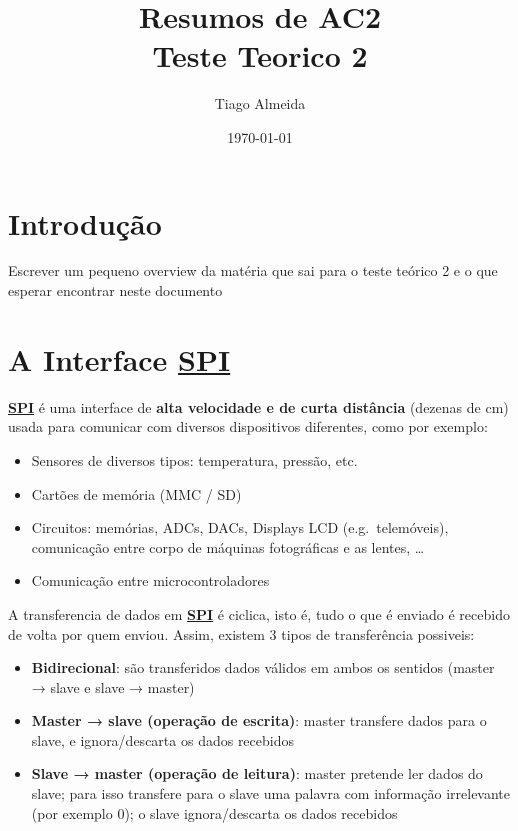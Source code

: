 \documentclass[a4paper, 12pt, onecolumn, oneside]{scrartcl}
\title{%
  Resumos de AC2 \\
  \large Teste Teorico 2}
\author{Tiago Almeida}
\date{\today}
\begin{document}
\maketitle

\tableofcontents

\section{Introdução}
Escrever um pequeno overview da matéria que sai para o teste teórico 2
e o que esperar encontrar neste documento

\clearpage

\section{A Interface \hyperref[spi]{\textbf{\large{SPI}}}}
\hyperref[spi]{\textbf{SPI}} é uma interface de \textbf{alta velocidade e de curta distância} (dezenas de cm) usada para comunicar com
diversos dispositivos diferentes, como por exemplo:
\begin{itemize}
    \item Sensores de diversos tipos: temperatura, pressão, etc.
    \item Cartões de memória (MMC / SD)
    \item Circuitos: memórias, ADCs, DACs, Displays LCD (e.g.\ telemóveis),
    comunicação entre corpo de máquinas fotográficas e as lentes, \ldots
    \item Comunicação entre microcontroladores
\end{itemize}

A transferencia de dados em \hyperref[spi]{\textbf{SPI}} é ciclica, isto é, tudo o que é enviado é recebido de volta por quem enviou.
Assim, existem 3 tipos de transferência possiveis:
\begin{itemize}
    \item \textbf{Bidirecional}: são transferidos dados válidos em ambos os sentidos
    (master → slave e slave → master)
    \item \textbf{Master → slave (operação de escrita)}: master transfere dados
    para o slave, e ignora/descarta os dados recebidos
    \item \textbf{Slave → master (operação de leitura)}: master pretende ler dados do slave; 
    para isso transfere para o slave uma palavra com informação irrelevante (por exemplo 0); 
    o slave ignora/descarta os dados recebidos
\end{itemize}
\end{document}
